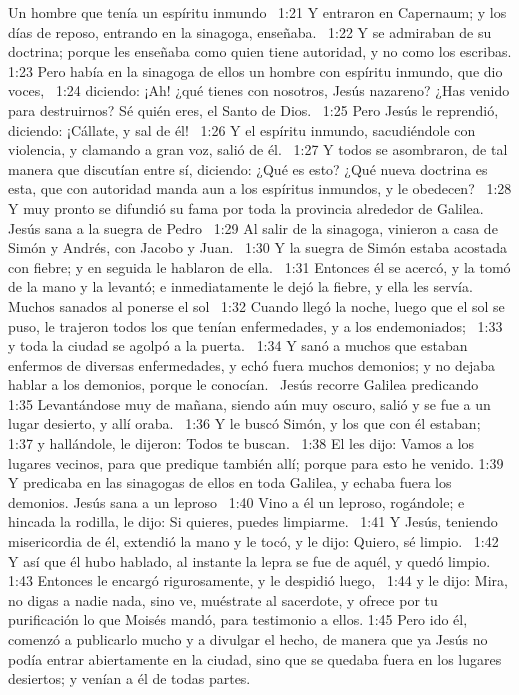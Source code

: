 Un hombre que tenía un espíritu inmundo   
1:21 Y entraron en Capernaum; y los días de reposo, entrando en la sinagoga, enseñaba.  
1:22 Y se admiraban de su doctrina; porque les enseñaba como quien tiene autoridad, y no como los escribas. 
1:23 Pero había en la sinagoga de ellos un hombre con espíritu inmundo, que dio voces,  
1:24 diciendo: ¡Ah! ¿qué tienes con nosotros, Jesús nazareno? ¿Has venido para destruirnos? Sé quién eres, el Santo de Dios.  
1:25 Pero Jesús le reprendió, diciendo: ¡Cállate, y sal de él!  
1:26 Y el espíritu inmundo, sacudiéndole con violencia, y clamando a gran voz, salió de él.  
1:27 Y todos se asombraron, de tal manera que discutían entre sí, diciendo: ¿Qué es esto? ¿Qué nueva doctrina es esta, que con autoridad manda aun a los espíritus inmundos, y le obedecen?  
1:28 Y muy pronto se difundió su fama por toda la provincia alrededor de Galilea. 
Jesús sana a la suegra de Pedro   
1:29 Al salir de la sinagoga, vinieron a casa de Simón y Andrés, con Jacobo y Juan.  
1:30 Y la suegra de Simón estaba acostada con fiebre; y en seguida le hablaron de ella.  
1:31 Entonces él se acercó, y la tomó de la mano y la levantó; e inmediatamente le dejó la fiebre, y ella les servía.  
Muchos sanados al ponerse el sol   
1:32 Cuando llegó la noche, luego que el sol se puso, le trajeron todos los que tenían enfermedades, y a los endemoniados;  
1:33 y toda la ciudad se agolpó a la puerta.  
1:34 Y sanó a muchos que estaban enfermos de diversas enfermedades, y echó fuera muchos demonios; y no dejaba hablar a los demonios, porque le conocían.  
Jesús recorre Galilea predicando   
1:35 Levantándose muy de mañana, siendo aún muy oscuro, salió y se fue a un lugar desierto, y allí oraba.  
1:36 Y le buscó Simón, y los que con él estaban;  
1:37 y hallándole, le dijeron: Todos te buscan.  
1:38 El les dijo: Vamos a los lugares vecinos, para que predique también allí; porque para esto he venido. 
1:39 Y predicaba en las sinagogas de ellos en toda Galilea, y echaba fuera los demonios. 
Jesús sana a un leproso   
1:40 Vino a él un leproso, rogándole; e hincada la rodilla, le dijo: Si quieres, puedes limpiarme.  
1:41 Y Jesús, teniendo misericordia de él, extendió la mano y le tocó, y le dijo: Quiero, sé limpio.  
1:42 Y así que él hubo hablado, al instante la lepra se fue de aquél, y quedó limpio.  
1:43 Entonces le encargó rigurosamente, y le despidió luego,  
1:44 y le dijo: Mira, no digas a nadie nada, sino ve, muéstrate al sacerdote, y ofrece por tu purificación lo que Moisés mandó, para testimonio a ellos. 
1:45 Pero ido él, comenzó a publicarlo mucho y a divulgar el hecho, de manera que ya Jesús no podía entrar abiertamente en la ciudad, sino que se quedaba fuera en los lugares desiertos; y venían a él de todas partes.  
